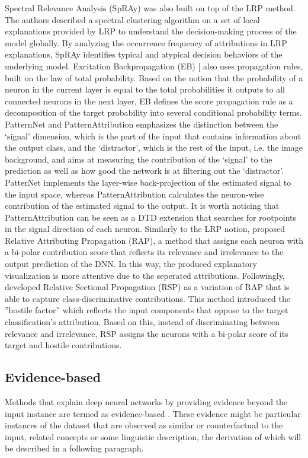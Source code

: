 \documentclass[journal]{IEEEtran}
\begin{document}
Spectral Relevance Analysis (SpRAy) \cite{Lapuschkin2019} was also built on top of the LRP method. The authors described a spectral clustering algorithm on a set of local explanations provided by LRP to understand the decision-making process of the model globally. By analyzing the occurrence frequency of attributions in LRP explanations, SpRAy identifies typical and atypical decision behaviors of the underlying model.
Excitation Backpropagation (EB) [\cite{Zhang2018a} \cite{Pope2019} also uses propagation rules, built on the law of total probability. Based on the notion that the probability of a neuron in the current layer is equal to the total probabilities it outputs to all connected neurons in the next layer, EB defines the score propagation rule as a decomposition of the target probability into several conditional probability terms. 
PatternNet and PatternAttribution \cite{Kindermans2018} emphasizes the distinction between the ‘signal’ dimension, which is the part of the input that contains information about the output class, and the ‘distractor’, which is the rest of the input, i.e. the image background, and aims at measuring the contribution of the ‘signal’ to the prediction as well as how good the network is at filtering out the ‘distractor’. PatterNet implements the layer-wise back-projection of the estimated signal to the input space, whereas PatternAttribution calculates the neuron-wise contribution of the estimated signal to the output. It is worth noticing that PatternAttribution can be seen as a DTD extension that searches for rootpoints in the signal direction of each neuron.
Similarly to the LRP notion, \cite{Nam2020} proposed Relative Attributing Propagation (RAP), a method that assigns each neuron with a bi-polar contribution score that reflects its relevance and irrelevance to the output prediction of the DNN. In this way, the produced explanatory visualization is more attentive due to the seperated attributions.
Followingly, \cite{Nam2020a} developed Relative Sectional Propagation (RSP) as a variation of RAP that is able to capture class-discriminative contributions. This method introduced the ''hostile factor'' which reflects the input components that oppose to the target classification's attribution. Based on this, instead of discriminating between relevance and irrelevance, RSP assigns the neurons with a bi-polar score of its target and hostile contributions.

\subsection{Evidence-based}
Methods that explain deep neural networks by providing evidence beyond the input instance are termed as evidence-based \cite{Adadi2018}. These evidence might be particular instances of the dataset that are observed as similar or counterfactual to the input, related concepts or some linguistic description, the derivation of which will be described in a following paragraph.
\end{document}
